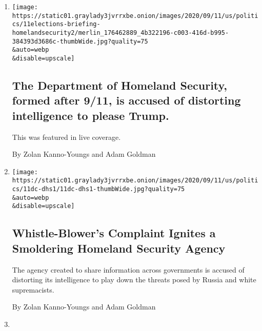 \begin{enumerate}
\def\labelenumi{\arabic{enumi}.}
\item
  \href{/live/2020/09/11/us/trump-vs-biden/the-department-of-homeland-security-formed-after-9-11-is-accused-of-distorting-intelligence-to-please-trump}{}

  \texttt{[image: https://static01.graylady3jvrrxbe.onion/images/2020/09/11/us/politics/11elections-briefing-homelandsecurity2/merlin\_176462889\_4b322196-c003-416d-b995-384393d3686c-thumbWide.jpg?quality=75\\\&auto=webp\\\&disable=upscale]}

  \hypertarget{the-department-of-homeland-security-formed-after-911-is-accused-of-distorting-intelligence-to-please-trump}{%
  \subsection{The Department of Homeland Security, formed after 9/11, is
  accused of distorting intelligence to please
  Trump.}\label{the-department-of-homeland-security-formed-after-911-is-accused-of-distorting-intelligence-to-please-trump}}

  This was featured in live coverage.

  By Zolan Kanno-Youngs and Adam Goldman
\item
  \href{/2020/09/11/us/politics/whistle-blower-homeland-security.html}{}

  \texttt{[image: https://static01.graylady3jvrrxbe.onion/images/2020/09/11/us/politics/11dc-dhs1/11dc-dhs1-thumbWide.jpg?quality=75\\\&auto=webp\\\&disable=upscale]}

  \hypertarget{whistle-blowers-complaint-ignites-a-smoldering-homeland-security-agency}{%
  \subsection{Whistle-Blower's Complaint Ignites a Smoldering Homeland
  Security
  Agency}\label{whistle-blowers-complaint-ignites-a-smoldering-homeland-security-agency}}

  The agency created to share information across governments is accused
  of distorting its intelligence to play down the threats posed by
  Russia and white supremacists.

  By Zolan Kanno-Youngs and Adam Goldman
\item
  \href{/2020/09/09/us/elections/a-whistle-blower-accuses-top-homeland-security-officials-of-playing-down-threats-from-russia-and-white-supremacists.html}{}


\end{enumerate}

